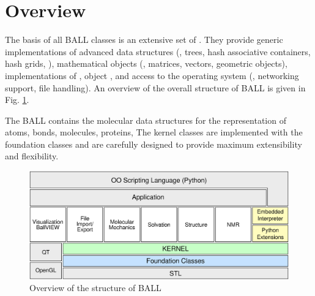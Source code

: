 \section{Overview}

The basis of all BALL classes is an extensive set of .  They provide generic implementations of advanced data structures
(\eg, trees, hash associative containers, hash grids, \etc), mathematical
objects (\eg, matrices, vectors, geometric objects), implementations of
, object , and access to the
operating system (\eg, networking support, file handling). An overview of the
overall structure of BALL is given in Fig. \ref{fig:BALL_structure}.

The BALL  contains the molecular data structures for the
representation of atoms, bonds, molecules, proteins, \etc  The kernel classes
are implemented with the foundation classes and are carefully designed to
provide maximum extensibility and flexibility.
\begin{figure}[tb]
  \centering\includegraphics[width=\textwidth]{BALL_structure.eps}
  \caption{Overview of the structure of BALL}
  \label{fig:BALL_structure}
\end{figure}

